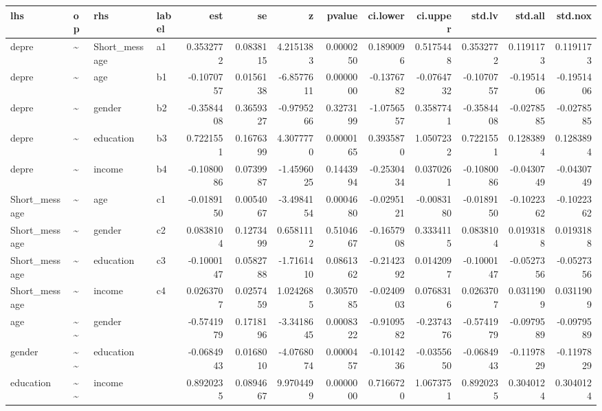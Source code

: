 \documentclass[
]{article}
\begin{document}
\begin{table}[!h]
\centering
\begin{tabular}[t]{llllrrrrrrrrr}
\toprule
lhs & op & rhs & label & est & se & z & pvalue & ci.lower & ci.upper & std.lv & std.all & std.nox\\
\midrule
depre & \textasciitilde{} & Short\_message & a1 & 0.3532772 & 0.0838115 & 4.2151383 & 0.0000250 & 0.1890096 & 0.5175448 & 0.3532772 & 0.1191173 & 0.1191173\\
depre & \textasciitilde{} & age & b1 & -0.1070757 & 0.0156138 & -6.8577611 & 0.0000000 & -0.1376782 & -0.0764732 & -0.1070757 & -0.1951406 & -0.1951406\\
depre & \textasciitilde{} & gender & b2 & -0.3584408 & 0.3659327 & -0.9795266 & 0.3273199 & -1.0756557 & 0.3587741 & -0.3584408 & -0.0278585 & -0.0278585\\
depre & \textasciitilde{} & education & b3 & 0.7221551 & 0.1676399 & 4.3077770 & 0.0000165 & 0.3935870 & 1.0507232 & 0.7221551 & 0.1283894 & 0.1283894\\
depre & \textasciitilde{} & income & b4 & -0.1080086 & 0.0739987 & -1.4596025 & 0.1443994 & -0.2530434 & 0.0370261 & -0.1080086 & -0.0430749 & -0.0430749\\
\addlinespace
Short\_message & \textasciitilde{} & age & c1 & -0.0189150 & 0.0054067 & -3.4984154 & 0.0004680 & -0.0295121 & -0.0083180 & -0.0189150 & -0.1022362 & -0.1022362\\
Short\_message & \textasciitilde{} & gender & c2 & 0.0838104 & 0.1273499 & 0.6581112 & 0.5104667 & -0.1657908 & 0.3334115 & 0.0838104 & 0.0193188 & 0.0193188\\
Short\_message & \textasciitilde{} & education & c3 & -0.1000147 & 0.0582788 & -1.7161410 & 0.0861362 & -0.2142392 & 0.0142097 & -0.1000147 & -0.0527356 & -0.0527356\\
Short\_message & \textasciitilde{} & income & c4 & 0.0263707 & 0.0257459 & 1.0242685 & 0.3057085 & -0.0240903 & 0.0768316 & 0.0263707 & 0.0311909 & 0.0311909\\
age & \textasciitilde{}\textasciitilde{} & gender &  & -0.5741979 & 0.1718196 & -3.3418645 & 0.0008322 & -0.9109582 & -0.2374376 & -0.5741979 & -0.0979589 & -0.0979589\\
\addlinespace
gender & \textasciitilde{}\textasciitilde{} & education &  & -0.0684943 & 0.0168010 & -4.0768074 & 0.0000457 & -0.1014236 & -0.0355650 & -0.0684943 & -0.1197829 & -0.1197829\\
education & \textasciitilde{}\textasciitilde{} & income &  & 0.8920235 & 0.0894667 & 9.9704499 & 0.0000000 & 0.7166720 & 1.0673751 & 0.8920235 & 0.3040124 & 0.3040124\\

\end{tabular}
\end{table}
\end{document}
